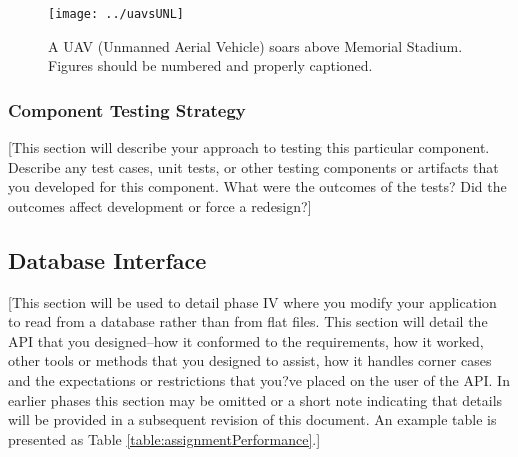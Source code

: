 \documentclass[12pt]{scrartcl} %
\begin{document}
\begin{figure}
\centering
\texttt{[image: ../uavsUNL]}
\caption{A UAV (Unmanned Aerial Vehicle) soars above Memorial Stadium.  Figures should be numbered and properly captioned.}
\label{figure:uav}
\end{figure}

\subsubsection{Component Testing Strategy}

[This section will describe your approach to testing this particular component.  Describe any test cases, unit tests, or other testing components or artifacts that you developed for this component.  What were the outcomes of the tests?  Did the outcomes affect development or force a redesign?]

\subsection{Database Interface}

[This section will be used to detail phase IV where you modify your application to read from a database rather than from flat files.  This section will detail the API that you designed--how it conformed to the requirements, how it worked, other tools or methods that you designed to assist, how it handles corner cases and the expectations or restrictions that you?ve placed on the user of the API.  In earlier phases this section may be omitted or a short note indicating that details will be provided in a subsequent revision of this document.  An example table is presented
as Table \ref{table:assignmentPerformance}.]
\end{document}
